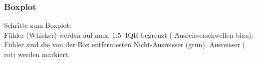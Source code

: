 \keinHeaderUndKeinFooter{}
\newpage
\keinHeaderUndKeinFooter{}
\subsubsection*{Boxplot}
Schritte zum Boxplot:\\
Fühler (Whisker) werden auf max. $1.5\cdot\textrm{IQR}$ begrenzt ({\color{blue} Ausreisserschwellen blau}): Fühler sind die von der Box
entferntesten Nicht-Ausreisser ({\color{FarnFarbe}grün}). Ausreisser
({\color{red} rot}) werden markiert.

\hrulefill

